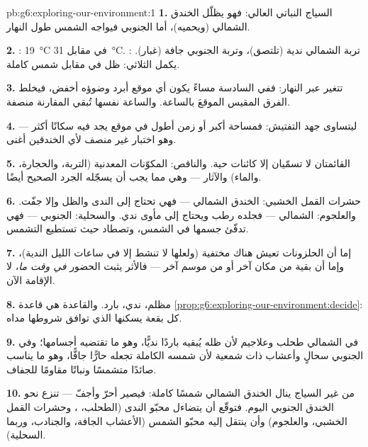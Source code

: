 \begin{solution}{pb:g6:exploring-our-environment:1}
\textbf{1.} السياج النباتي العالي: فهو يظلّل الخندق الشمالي
(ويحميه)، أما الجنوبي فيواجه الشمس طول النهار.

\textbf{2.} : \qty{19}{\degreeCelsius} في مقابل
\qty{31}{\degreeCelsius}. : تربة الشمالي ندية (تلتصق)،
وتربة الجنوبي جافة (غبار).  يكمل الثلاثي: ظل في مقابل شمس
كاملة.

\textbf{3.}  تتغير عبر النهار: ففي السادسة مساءً يكون أي
موقع أبرد وضوؤه أخفض، فيخلط الفرق المقيس الموقعَ بالساعة. والساعة
نفسها تُبقي المقارنة منصفة.

\textbf{4.} ليتساوى جهد التفتيش: فمساحة أكبر أو زمن أطول في موقع
يجد فيه سكانًا أكثر --- وهو اختبار غير منصف لأي الخندقين أغنى.

\textbf{5.} القائمتان لا تسمّيان إلا كائنات حية. والناقص:
المكوّنات المعدنية (التربة، والحجارة، والماء) والآثار --- وهي مما
يجب أن يسجّله الجرد الصحيح أيضًا.

\textbf{6.} حشرات القمل الخشبي: الخندق الشمالي --- فهي تحتاج إلى
الندى والظل وإلا جفّت. والعلجوم: الشمالي --- فجلده رطب ويحتاج إلى
مأوى ندي. والسحلية: الجنوبي --- فهي تدفّئ جسمها في الشمس، وتصطاد
حيث تستطيع التشمس.

\textbf{7.} إما أن الحلزونات تعيش هناك مختفية (ولعلها لا تنشط إلا
في ساعات الليل الندية)، وإما أن  بقية من مكان آخر أو من موسم
آخر --- فالأثر يثبت الحضور \emph{في وقت ما}، لا الإقامة الآن.

\textbf{8.} مظلم، ندي، بارد. والقاعدة هي قاعدة
\cref{prop:g6:exploring-our-environment:decide}: كل بقعة يسكنها
 الذي توافق شروطها مداه.

\textbf{9.} في الشمالي طحلب وعلاجيم لأن ظله يُبقيه باردًا نديًّا،
وهو ما تقتضيه أجسامها؛ وفي الجنوبي سحالٍ وأعشاب ذات  شمعية
لأن شمسه الكاملة تجعله حارًّا جافًّا، وهو ما يناسب صائدًا متشمسًا
ونباتًا مقاومًا للجفاف.

\textbf{10.} من غير السياج ينال الخندق الشمالي شمسًا كاملة: فيصير
أحرّ وأجفّ ---  تنزع نحو  الخندق الجنوبي اليوم. فتوقّع
أن يتضاءل محبّو الندى (الطحلب، ، وحشرات القمل الخشبي،
والعلجوم) وأن ينتقل إليه محبّو الشمس (الأعشاب الجافة، والجنادب،
وربما السحلية).


\end{solution}
